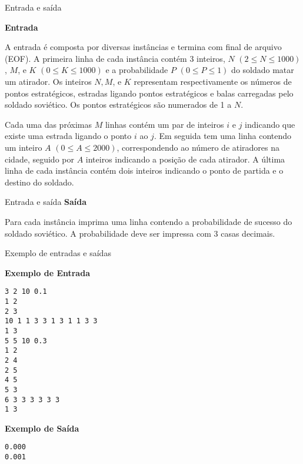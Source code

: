 \begin{frame}[fragile]{Entrada e saída}

\textbf{Entrada}

A entrada é composta por diversas instâncias e termina com final de arquivo (EOF). A primeira linha 
de cada instância contém 3 inteiros, $N$ $(2\leq N\leq 1000)$, $M$, e $K$ $(0\leq K\leq 1000)$ e a 
probabilidade $P$ $(0\leq P\leq 1)$ do soldado matar um atirador. Os inteiros $N, M$, e $K$ 
representam respectivamente os números de pontos estratégicos, estradas ligando pontos estratégicos 
e balas carregadas pelo soldado soviético. Os pontos estratégicos são numerados de 1 a $N$.

Cada uma das próximas $M$ linhas contém um par de inteiros $i$ e $j$ indicando que existe uma 
estrada ligando o ponto $i$ ao $j$. Em seguida tem uma linha contendo um inteiro $A$ 
$(0\leq A\leq 2000)$, correspondendo ao número de atiradores na cidade, seguido por $A$ inteiros 
indicando a posição de cada atirador. A última linha de cada instância contém dois inteiros 
indicando o ponto de partida e o destino do soldado.

\end{frame}

\begin{frame}[fragile]{Entrada e saída}
\textbf{Saída}

Para cada instância imprima uma linha contendo a probabilidade de sucesso do soldado soviético. A probabilidade deve ser impressa com 3 casas decimais.

\end{frame}

\begin{frame}[fragile]{Exemplo de entradas e saídas}

\begin{minipage}[t]{0.5\textwidth}
\textbf{Exemplo de Entrada}
\begin{verbatim}
3 2 10 0.1
1 2
2 3
10 1 1 3 3 1 3 1 1 3 3
1 3
5 5 10 0.3
1 2
2 4
2 5
4 5
5 3
6 3 3 3 3 3 3
1 3
\end{verbatim}
\end{minipage}
\begin{minipage}[t]{0.45\textwidth}
\textbf{Exemplo de Saída}
\begin{verbatim}
0.000
0.001
\end{verbatim}
\end{minipage}
\end{frame}

